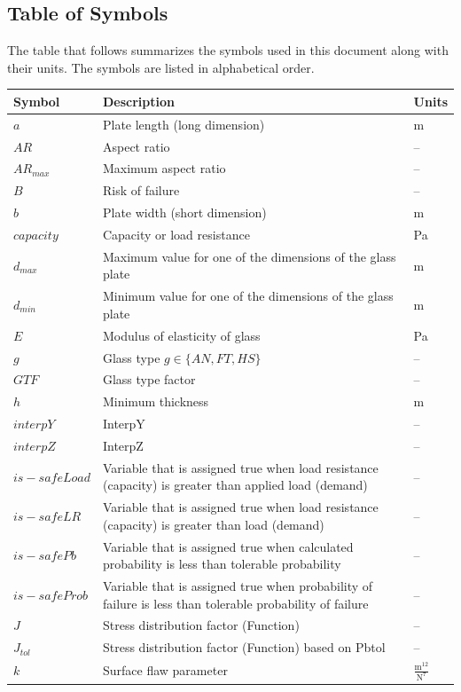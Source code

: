 \documentclass[12pt]{article}
\begin{document}
\subsection{Table of Symbols}
\label{Sec:ToS}
The table that follows summarizes the symbols used in this document along with their units. The symbols are listed in alphabetical order.
\begin{longtabu}{l X[l] l}
\toprule
Symbol & Description & Units
\\
\midrule
\endhead
$a$ & Plate length (long dimension) & m
\\
$AR$ & Aspect ratio & --
\\
${AR_{max}}$ & Maximum aspect ratio & --
\\
$B$ & Risk of failure & --
\\
$b$ & Plate width (short dimension) & m
\\
$capacity$ & Capacity or load resistance & Pa
\\
${d_{max}}$ & Maximum value for one of the dimensions of the glass plate & m
\\
${d_{min}}$ & Minimum value for one of the dimensions of the glass plate & m
\\
$E$ & Modulus of elasticity of glass & Pa
\\
$g$ & Glass type $g\in{}\{AN,FT,HS\}$ & --
\\
$GTF$ & Glass type factor & --
\\
$h$ & Minimum thickness & m
\\
$interpY$ & InterpY & --
\\
$interpZ$ & InterpZ & --
\\
$is-safeLoad$ & Variable that is assigned true when load resistance (capacity) is greater than applied load (demand) & --
\\
$is-safeLR$ & Variable that is assigned true when load resistance (capacity) is greater than load (demand) & --
\\
$is-safePb$ & Variable that is assigned true when calculated probability is less than tolerable probability & --
\\
$is-safeProb$ & Variable that is assigned true when probability of failure is less than tolerable probability of failure & --
\\
$J$ & Stress distribution factor (Function) & --
\\
${J_{tol}}$ & Stress distribution factor (Function) based on Pbtol & --
\\
$k$ & Surface flaw parameter & $\frac{\text{m}^{12}}{\text{N}^{7}}$
\\

\end{longtabu}
\end{document}
